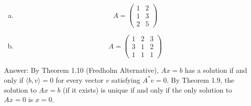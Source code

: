 \documentclass{article}
\begin{document}
\begin{enumerate}[a.]
\item

$$
A = \begin{pmatrix}
1 & 2 \\ 1 & 3 \\ 2 & 5
\end{pmatrix}
$$

\item
$$
A = \begin{pmatrix}
1 & 2 & 3 \\ 3 & 1 & 2 \\ 1 & 1 & 1
\end{pmatrix}
$$
\end{enumerate}

Answer: By Theorem 1.10 (Fredholm Alternative), $Ax = b$ has a solution if and only if $\langle b , v \rangle = 0$ for every vector $v$ satisfying $A^*v = 0$. By Theorem 1.9, the solution to $Ax = b$ (if it exists) is unique if and only if the only solution to $Ax = 0$ is $x = 0$. 
\end{document}
